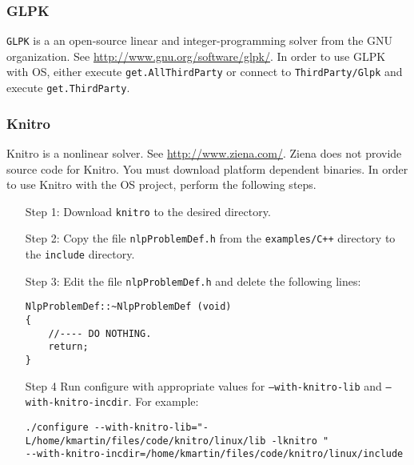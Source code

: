 \documentclass[11pt]{article}
\renewcommand{\_}{{\char"5F}}
\renewcommand{\{}{{\char"7B}}
\renewcommand{\}}{{\char"7D}}
\renewcommand{\^}{{\char"0D}}
\renewcommand{\'}{{\char"0D}}
\begin{document}
\subsubsection{GLPK}

{\tt GLPK} is a an open-source linear and integer-programming solver from the GNU organization. See \url{http://www.gnu.org/software/glpk/}.  In order to use GLPK with OS, either execute {\tt get.AllThirdParty} or connect to {\tt ThirdParty/Glpk} and execute {\tt get.ThirdParty}.










\subsubsection{Knitro}


Knitro is a nonlinear solver. See \url{http://www.ziena.com/}.  Ziena does not provide source code for Knitro.  You must download platform dependent binaries.   In order to use Knitro with the OS project, perform the following steps.

\begin{itemize}



\item[Step 1:]  Download {\tt knitro} to the desired directory.


\item[Step 2:] Copy the file {\tt nlpProblemDef.h} from the {\tt examples/C++} directory to the {\tt include} directory.

\item[Step 3:]  Edit the file {\tt nlpProblemDef.h} and delete the following lines:

\begin{verbatim}
NlpProblemDef::~NlpProblemDef (void)
{
    //---- DO NOTHING.
    return;
}
\end{verbatim}




\item[Step 4] Run configure with appropriate values for  {\tt --with-knitro-lib} and {\tt --with-knitro-incdir}. For example:

\begin{verbatim}
./configure --with-knitro-lib="-L/home/kmartin/files/code/knitro/linux/lib -lknitro "
--with-knitro-incdir=/home/kmartin/files/code/knitro/linux/include
\end{verbatim}

\end{itemize}
\end{document}
